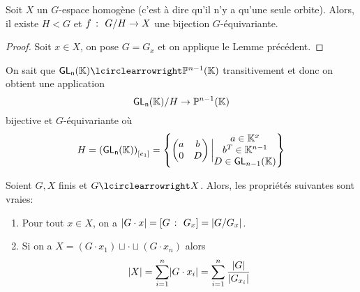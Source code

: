 \begin{corollary}
    Soit \(X\) un \(G\)-espace homogène (c'est à dire qu'il n'y a qu'une seule orbite). Alors,
    il existe \(H < G\) et \(f\ \colon\  G/H\to X\) une bijection \(G\)-équivariante.
\end{corollary}

\begin{proof}
    Soit \(x\in X\), on pose \(G = G_x\) et on applique le Lemme précédent.
\end{proof}

\begin{example}
    On sait que \(\GLn(\bb K)\act \bb P^{n-1}(\bb K)\) transitivement et
    donc on obtient une application
    \begin{equation*}
        \operatorname{\mathsf{GL_{n}}}(\mathbb{K})/ H\to \mathbb{P}^{n-1}(\mathbb{K})
    \end{equation*}
    bijective et \(G\)-équivariante où
    \begin{equation*}
        H = {(\operatorname{\mathsf{GL_{n}}}(\mathbb{K}))}_{\mathopen{}\left[e_1\right]\mathclose{}} =
        \left\{
            \begin{pmatrix}
                a&b\\
                0&D
            \end{pmatrix}
            \bigg |
            \begin{matrix}
                a\in \mathbb{K}^x\\
                b^T \in\mathbb{K}^{n-1}\\
                D\in \mathsf{GL}_{n-1}(\mathbb{K})
            \end{matrix}
        \right\}
    \end{equation*}
\end{example}

\begin{corollary}
    Soient \(G,X\) finis et \(G\act X\). Alors, les propriétés suivantes sont vraies:
    \begin{enumerate}[label=(\roman*)] %
        \item Pour tout \(x\in X\), on a \(\mathopen{}\left|G\cdot x\right|\mathclose{} = \mathopen{}\left[G\ \colon\  G_x\right]\mathclose{} = \mathopen{}\left|G/G_x\right|\mathclose{}\).
        \item Si on a \(X = (G\cdot x_1) \sqcup \cdot \sqcup (G\cdot x_n)\) alors
        \begin{equation*}
            \mathopen{}\left|X\right|\mathclose{} = \sum_{i=1}^n \mathopen{}\left|G\cdot x_i\right|\mathclose{} = \sum_{i=1}^n \frac{\mathopen{}\left|G\right|\mathclose{}}{\mathopen{}\left|G_{x_i}\right|\mathclose{}}
        \end{equation*}
    \end{enumerate}
\end{corollary}

